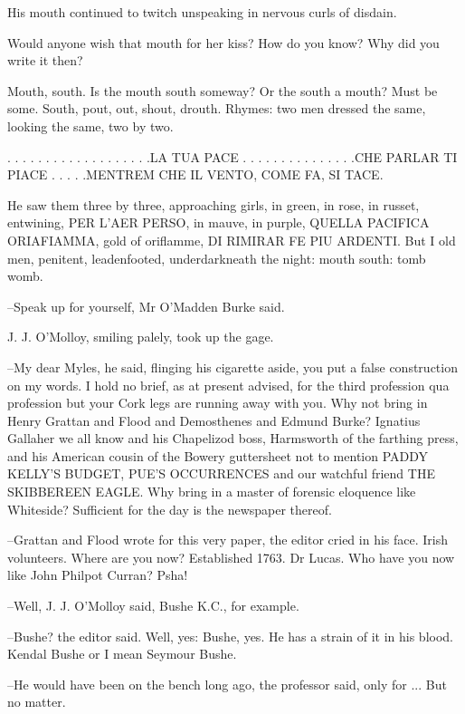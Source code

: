 His mouth continued to twitch unspeaking in nervous curls of disdain.

Would anyone wish that mouth for her kiss? How do you know? Why did
you write it then?



Mouth, south. Is the mouth south someway? Or the south a mouth?
Must be some. South, pout, out, shout, drouth. Rhymes: two men dressed
the same, looking the same, two by two.


    . . . . . . . . . . . . . . . . . . .LA TUA PACE
    . . . . . . . . . . . . . . .CHE PARLAR TI PIACE
    . . . . .MENTREM CHE IL VENTO, COME FA, SI TACE.


He saw them three by three, approaching girls, in green, in rose, in
russet, entwining, PER L'AER PERSO, in mauve, in purple, QUELLA PACIFICA
ORIAFIAMMA, gold of oriflamme, DI RIMIRAR FE PIU ARDENTI. But I old men,
penitent, leadenfooted, underdarkneath the night: mouth south: tomb womb.

--Speak up for yourself, Mr O'Madden Burke said.



J. J. O'Molloy, smiling palely, took up the gage.

--My dear Myles, he said, flinging his cigarette aside, you put a false
construction on my words. I hold no brief, as at present advised, for the
third profession qua profession but your Cork legs are running away with
you. Why not bring in Henry Grattan and Flood and Demosthenes and
Edmund Burke? Ignatius Gallaher we all know and his Chapelizod boss,
Harmsworth of the farthing press, and his American cousin of the Bowery
guttersheet not to mention PADDY KELLY'S BUDGET, PUE'S OCCURRENCES and our
watchful friend THE SKIBBEREEN EAGLE. Why bring in a master of forensic
eloquence like Whiteside? Sufficient for the day is the newspaper thereof.



--Grattan and Flood wrote for this very paper, the editor cried in his
face. Irish volunteers. Where are you now? Established 1763. Dr Lucas.
Who have you now like John Philpot Curran? Psha!

--Well, J. J. O'Molloy said, Bushe K.C., for example.

--Bushe? the editor said. Well, yes: Bushe, yes. He has a strain of it in
his blood. Kendal Bushe or I mean Seymour Bushe.

--He would have been on the bench long ago, the professor said, only
for ... But no matter.

